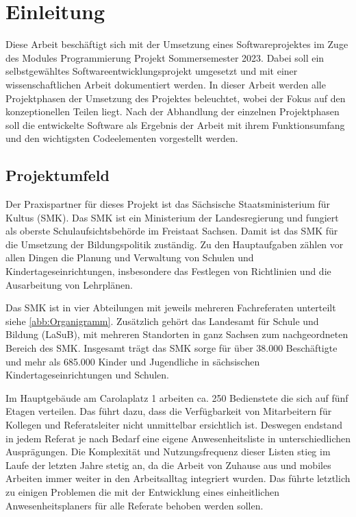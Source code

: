 \section{Einleitung}
\label{sec:Einleitung}
Diese Arbeit beschäftigt sich mit der Umsetzung eines Softwareprojektes im Zuge des Modules Programmierung Projekt Sommersemester 2023. Dabei soll ein selbstgewähltes Softwareentwicklungsprojekt umgesetzt und mit einer wissenschaftlichen Arbeit dokumentiert werden. In dieser Arbeit werden alle Projektphasen der Umsetzung des Projektes beleuchtet, wobei der Fokus auf den konzeptionellen Teilen liegt. Nach der Abhandlung der einzelnen Projektphasen soll die entwickelte Software als Ergebnis der Arbeit mit ihrem Funktionsumfang und den wichtigsten Codeelementen vorgestellt werden.

\subsection{Projektumfeld}
\label{sec:Projektumfeld}
Der Praxispartner für dieses Projekt ist das Sächsische Staatsministerium für Kultus (SMK). Das SMK ist ein Ministerium der Landesregierung und fungiert als oberste Schulaufsichtsbehörde im Freistaat Sachsen. Damit ist das SMK für die Umsetzung der Bildungspolitik zuständig. Zu den Hauptaufgaben zählen vor allen Dingen die Planung und Verwaltung von Schulen und Kindertageseinrichtungen, insbesondere das Festlegen von Richtlinien und die Ausarbeitung von Lehrplänen.

Das SMK ist in vier Abteilungen mit jeweils mehreren Fachreferaten unterteilt siehe \ref{abb:Organigramm}. Zusätzlich gehört das Landesamt für Schule und Bildung (LaSuB), mit mehreren Standorten in ganz Sachsen zum nachgeordneten Bereich des SMK. Insgesamt trägt das SMK sorge für über 38.000 Beschäftigte und mehr als 685.000 Kinder und Jugendliche in sächsischen Kindertageseinrichtungen und Schulen.

Im Hauptgebäude am Carolaplatz 1 arbeiten ca. 250 Bedienstete die sich auf fünf Etagen verteilen. Das führt dazu, dass die Verfügbarkeit von Mitarbeitern für Kollegen und Referatsleiter nicht unmittelbar ersichtlich ist. Deswegen endstand in jedem Referat je nach Bedarf eine eigene Anwesenheitsliste in unterschiedlichen Ausprägungen. Die Komplexität und Nutzungsfrequenz dieser Listen stieg im Laufe der letzten Jahre stetig an, da die Arbeit von Zuhause aus und mobiles Arbeiten immer weiter in den Arbeitsalltag integriert wurden. Das führte letztlich zu einigen Problemen die mit der Entwicklung eines einheitlichen Anwesenheitsplaners für alle Referate behoben werden sollen.

